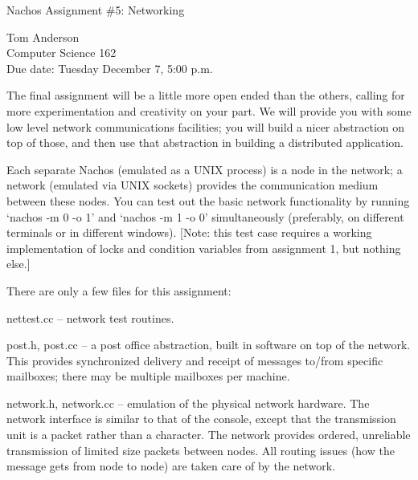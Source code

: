 

\begin{center}
{\large Nachos Assignment \#5: Networking

\vspace{.2in}
Tom Anderson\\
Computer Science 162\\
Due date: Tuesday December 7, 5:00 p.m.
}
\end{center}

\vspace{.2in}

The final assignment will be a little more open ended than the others,
calling for more experimentation and creativity on your part.  
We will provide you with some low level network communications facilities;
you will build a nicer abstraction on top of those, and then use
that abstraction in building a distributed application.

Each separate Nachos (emulated as a UNIX process) is a node in the network;
a network (emulated via UNIX sockets) provides the communication medium
between these nodes.  You can test out the basic network functionality
by running `nachos -m 0 -o 1' and `nachos -m 1 -o 0' simultaneously 
(preferably, on different terminals or in different windows).
[Note: this test case requires a working implementation of locks
and condition variables from assignment 1, but nothing else.]

There are only a few files for this assignment:

\begin{description}

\item nettest.cc -- network test routines.

\item post.h, post.cc -- a post office abstraction, built in software
on top of the network.  This provides synchronized delivery and
receipt of messages to/from specific mailboxes; there may be multiple
mailboxes per machine.

\item network.h, network.cc -- emulation of the physical network hardware.
The network interface is similar to that of the console, except
that the transmission unit is a packet rather than a character.
The network provides ordered, unreliable transmission of limited
size packets between nodes.  All routing issues (how the message
gets from node to node) are taken care of by the network.

\end{description}

